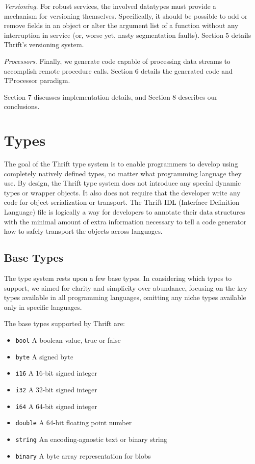 \documentclass[nocopyrightspace,blockstyle]{sigplanconf}
\begin{document}
\textit{Versioning.} For robust services, the involved datatypes must
provide a mechanism for versioning themselves. Specifically,
it should be possible to add or remove fields in an object or alter the
argument list of a function without any interruption in service (or,
worse yet, nasty segmentation faults). Section 5 details Thrift's versioning
system.

\textit{Processors.} Finally, we generate code capable of processing data
streams to accomplish remote procedure calls. Section 6 details the generated
code and TProcessor paradigm.

Section 7 discusses implementation details, and Section 8 describes
our conclusions.

\section{Types}

The goal of the Thrift type system is to enable programmers to develop using
completely natively defined types, no matter what programming language they
use. By design, the Thrift type system does not introduce any special dynamic
types or wrapper objects. It also does not require that the developer write
any code for object serialization or transport. The Thrift IDL (Interface
Definition Language) file is
logically a way for developers to annotate their data structures with the
minimal amount of extra information necessary to tell a code generator
how to safely transport the objects across languages.

\subsection{Base Types}

The type system rests upon a few base types. In considering which types to
support, we aimed for clarity and simplicity over abundance, focusing
on the key types available in all programming languages, omitting any
niche types available only in specific languages.

The base types supported by Thrift are:
\begin{itemize}
\item \texttt{bool} A boolean value, true or false
\item \texttt{byte} A signed byte
\item \texttt{i16} A 16-bit signed integer
\item \texttt{i32} A 32-bit signed integer
\item \texttt{i64} A 64-bit signed integer
\item \texttt{double} A 64-bit floating point number
\item \texttt{string} An encoding-agnostic text or binary string
\item \texttt{binary} A byte array representation for blobs
\end{itemize}
\end{document}
